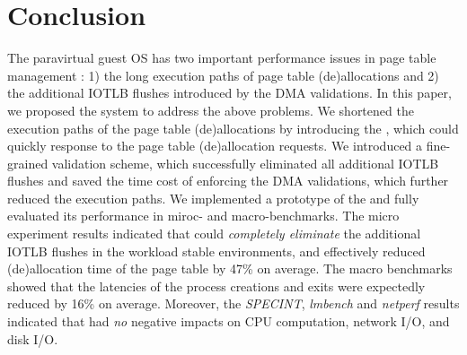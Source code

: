 \section{Conclusion} \label{sec:con}
The paravirtual guest OS has two important performance issues in page table management : 1) the long execution paths of page table (de)allocations and 2) the additional IOTLB flushes introduced by the DMA validations.
In this paper, we proposed the \name system to address the above problems.
We shortened the execution paths of the page table (de)allocations by introducing the \cache, which could quickly response to the page table (de)allocation requests.
We introduced a fine-grained validation scheme, which successfully eliminated all additional IOTLB flushes and saved the time cost of enforcing the DMA validations, which further reduced the execution paths.
We implemented a prototype of the \name and fully evaluated its performance in miroc- and macro-benchmarks.
The micro experiment results indicated that \name could \emph{completely eliminate} the additional IOTLB flushes in the workload stable environments, and effectively reduced (de)allocation time of the page table by 47\% on average.
The macro benchmarks showed that the latencies of the process creations and exits were expectedly reduced by 16\% on average.
Moreover, the \emph{SPECINT}, \emph{lmbench} and \emph{netperf} results indicated that \name had \emph{no} negative impacts on CPU computation, network I/O, and disk I/O.
